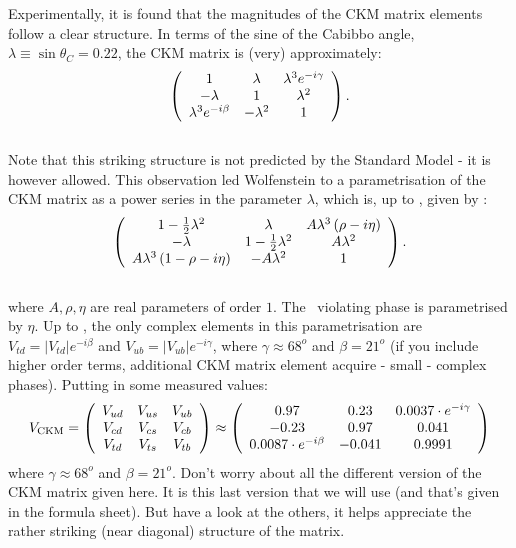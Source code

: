  Experimentally, it is found that the magnitudes of the CKM matrix
 elements follow a clear structure. In terms of the sine of the
 Cabibbo angle, $\lambda\equiv \sin\theta_C=0.22$, the CKM matrix is (very) approximately:
\begin{equation}
\label{eq:ckmLambda}
 \left( \begin{array}{ccc}  1  & \lambda & \lambda^3 e^{-i\gamma} \\ 
      -\lambda & 1 & \lambda^2 \\ 
      \lambda^3 e^{-i\beta} & -\lambda^2 & 1 \end{array} \right)
.
\end{equation}\\
 Note that this striking structure is not predicted by the Standard
 Model - it is however allowed.  This observation led Wolfenstein to a
 parametrisation of the CKM matrix as a power series in the parameter
 $\lambda$, which is, up to , given by
 \cite{wolfenstein}: {\small
\begin{equation}
 \left( \begin{array}{ccc}  1-\frac{1}{2} \lambda^2     &  
                   \lambda                 &  
                        A\lambda^3\left(\rho-i\eta\right)  \\ 
       -\lambda              &  
                    1-\frac{1}{2} \lambda^2      &  
                        A \lambda^2                         \\ 
      A\lambda^3\left(1-\rho-i\eta\right) & 
                    -A \lambda^2       & 
                        1                                   \end{array} \right)
.
\end{equation}}\\
 where $A, \rho, \eta$ are real parameters of order $1$. The \cp\
 violating phase is parametrised by $\eta$. Up to ,
 the only complex elements in this parametrisation are $V_{td}=|V_{td}|e^{-i\beta}$ and
 $V_{ub}=|V_{ub}|e^{-i\gamma}$, where $\gamma \approx 68^o$ and $\beta = 21^o$ (if you include higher order terms, additional CKM matrix element acquire - small - complex phases).
 Putting in some measured values:
 \begin{equation}
\label{eq:th.b.ckmlabel_1}
  V_{\mathrm{CKM}}= \left( \begin{array}{ccc}  V_{ud}  &  V_{us}  &  V_{ub}  \\ 
                        V_{cd}  &  V_{cs}  &  V_{cb}  \\ 
                        V_{td}  &  V_{ts}  &  V_{tb}  \end{array} \right)
\approx
                  \left( \begin{array}{ccc}  0.97  &  0.23  &  0.0037\cdot e^{-i \gamma}  \\ 
                        -0.23  &  0.97 & 0.041  \\ 
                        0.0087\cdot e^{-i \beta}  & -0.041  & 0.9991  \end{array} \right)
\end{equation}
where $\gamma \approx 68^o$ and $\beta = 21^o$. Don't worry about all the different version of the CKM matrix given here. It is this last version that we will use (and that's given in the formula sheet). But have a look at the others, it helps appreciate the rather striking (near diagonal) structure of the matrix.

